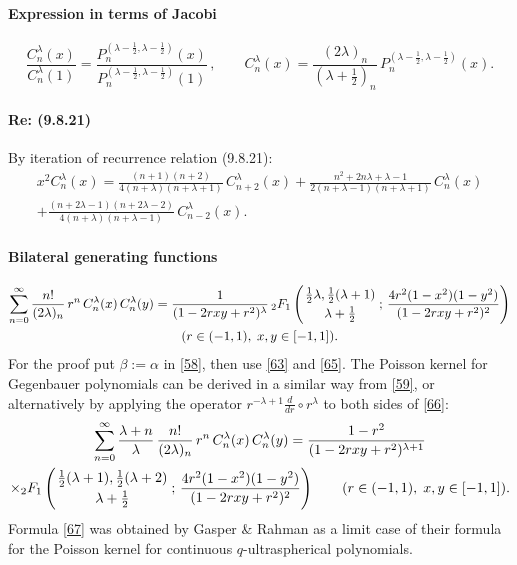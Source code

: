 \documentclass[envcountchap,graybox]{svmono}
\newcounter{rom}
\newcommand{\hyp}[5]{\mbox{}_{#1}{F}_{#2}
\left(\genfrac{}{}{0pt}{}{#3}{#4}\,;\,#5\right)}
\newcommand\al\alpha
\newcommand\be\beta
\newcommand\la\lambda
\newcommand\half{\frac12}
\newcommand\thalf{\tfrac12}
\newcommand\iy\infty
\begin{document}
\paragraph{Expression in terms of Jacobi}
%
\begin{equation}
\frac{C_n^\la(x)}{C_n^\la(1)}=
\frac{P_n^{(\la-\half,\la-\half)}(x)}{P_n^{(\la-\half,\la-\half)}(1)}\,,\qquad
C_n^\la(x)=\frac{(2\la)_n}{(\la+\thalf)_n}\,P_n^{(\la-\half,\la-\half)}(x).
\label{65}
\end{equation}
%
\paragraph{Re: (9.8.21)}
By iteration of recurrence relation (9.8.21):
\begin{multline}
x^2 C_n^\la(x)=
\frac{(n+1)(n+2)}{4(n+\la)(n+\la+1)}\,C_{n+2}^\la(x)+
\frac{n^2+2n\la+\la-1}{2(n+\la-1)(n+\la+1)}\,C_n^\la(x)\\
+\frac{(n+2\la-1)(n+2\la-2)}{4(n+\la)(n+\la-1)}\,C_{n-2}^\la(x).
\label{6}
\end{multline}
%
\paragraph{Bilateral generating functions}
\begin{multline}
\sum_{n=0}^\iy\frac{n!}{(2\la)_n}\,r^n\,C_n^\la(x)\,C_n^\la(y)
=\frac1{(1-2rxy+r^2)^\la}\,\hyp21{\thalf\la,\thalf(\la+1)}{\la+\thalf}
{\frac{4r^2(1-x^2)(1-y^2)}{(1-2rxy+r^2)^2}}\\
(r\in(-1,1),\;x,y\in[-1,1]).
\label{66}
\end{multline}
For the proof put $\be:=\al$ in \eqref{58}, then use \eqref{63} and \eqref{65}.
The Poisson kernel for Gegenbauer polynomials can be derived in a similar way
from \eqref{59}, or alternatively by applying the operator
$r^{-\la+1}\frac d{dr}\circ r^\la$ to both sides of \eqref{66}:
\begin{multline}
\sum_{n=0}^\iy\frac{\la+n}\la\,\frac{n!}{(2\la)_n}\,r^n\,C_n^\la(x)\,C_n^\la(y)
=\frac{1-r^2}{(1-2rxy+r^2)^{\la+1}}\\
\times\hyp21{\thalf(\la+1),\thalf(\la+2)}{\la+\thalf}
{\frac{4r^2(1-x^2)(1-y^2)}{(1-2rxy+r^2)^2}}\qquad
(r\in(-1,1),\;x,y\in[-1,1]).
\label{67}
\end{multline}
Formula \eqref{67} was obtained by Gasper \& Rahman 
as a limit case of their formula for the Poisson kernel for continuous
$q$-ultraspherical polynomials.
%
\end{document}
